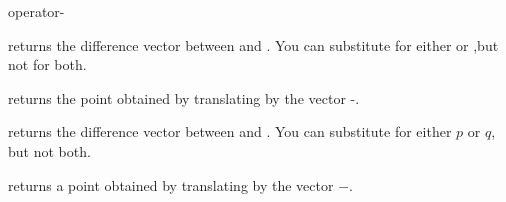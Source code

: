 \begin{ccRefFunction}{operator-}

       {returns the difference vector between  and . 
        You can substitute  for either  or 
        ,but not for both.}

       {returns the point obtained by translating  by the 
        vector -.}

       {returns the difference vector between  and .
        You can substitute  for either $p$
	or $q$, but not both.}

       {returns a point obtained by translating  by the 
        vector $-$.}

\ccSeeAlso
{} \\
 \\


\end{ccRefFunction}

